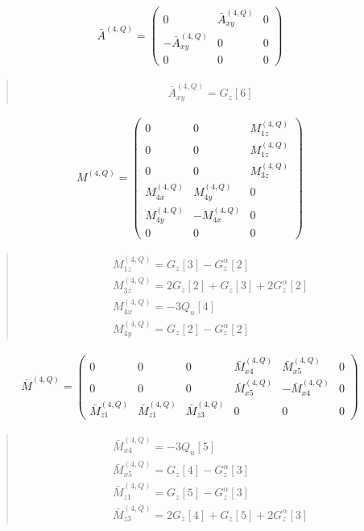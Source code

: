 \documentclass[fleqn,10pt]{jsarticle}
\begin{document}
\begin{align*}
\bar{A}^{(4,Q)} = \begin{pmatrix} 0 & \bar{A}^{(4,Q)}_{xy} & 0 \\ - \bar{A}^{(4,Q)}_{xy} & 0 & 0 \\ 0 & 0 & 0 \end{pmatrix}
\end{align*}
\begin{quote}
\begin{align*}
& \bar{A}^{(4,Q)}_{xy} = G_{z}[6]
\end{align*}
\end{quote}
\begin{align*}
M^{(4,Q)} = \begin{pmatrix} 0 & 0 & M^{(4,Q)}_{1z} \\ 0 & 0 & M^{(4,Q)}_{1z} \\ 0 & 0 & M^{(4,Q)}_{3z} \\ M^{(4,Q)}_{4x} & M^{(4,Q)}_{4y} & 0 \\ M^{(4,Q)}_{4y} & - M^{(4,Q)}_{4x} & 0 \\ 0 & 0 & 0 \end{pmatrix}
\end{align*}
\begin{quote}
\begin{align*}
& M^{(4,Q)}_{1z} = G_{z}[3] - G_{z}^{\alpha}[2] \\
& M^{(4,Q)}_{3z} = 2 G_{z}[2] + G_{z}[3] + 2 G_{z}^{\alpha}[2] \\
& M^{(4,Q)}_{4x} = - 3 Q_{u}[4] \\
& M^{(4,Q)}_{4y} = G_{z}[2] - G_{z}^{\alpha}[2]
\end{align*}
\end{quote}
\begin{align*}
\bar{M}^{(4,Q)} = \begin{pmatrix} 0 & 0 & 0 & \bar{M}^{(4,Q)}_{x4} & \bar{M}^{(4,Q)}_{x5} & 0 \\ 0 & 0 & 0 & \bar{M}^{(4,Q)}_{x5} & - \bar{M}^{(4,Q)}_{x4} & 0 \\ \bar{M}^{(4,Q)}_{z1} & \bar{M}^{(4,Q)}_{z1} & \bar{M}^{(4,Q)}_{z3} & 0 & 0 & 0 \end{pmatrix}
\end{align*}
\begin{quote}
\begin{align*}
& \bar{M}^{(4,Q)}_{x4} = - 3 Q_{u}[5] \\
& \bar{M}^{(4,Q)}_{x5} = G_{z}[4] - G_{z}^{\alpha}[3] \\
& \bar{M}^{(4,Q)}_{z1} = G_{z}[5] - G_{z}^{\alpha}[3] \\
& \bar{M}^{(4,Q)}_{z3} = 2 G_{z}[4] + G_{z}[5] + 2 G_{z}^{\alpha}[3]
\end{align*}
\end{quote}
\end{document}
